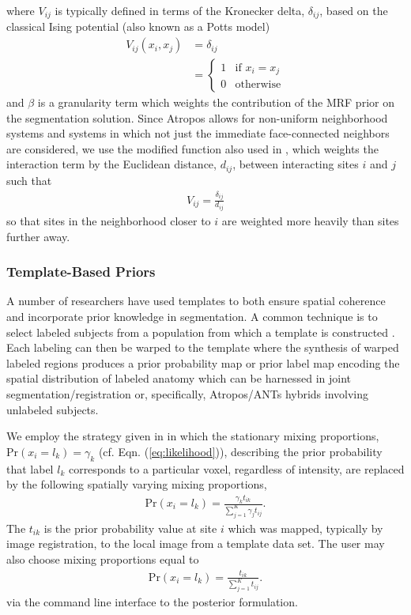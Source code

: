 \documentclass[11pt,english]{article}
\begin{document}
where $V_{ij}$ is typically defined in terms of the Kronecker delta,
$\delta_{ij}$, based on the classical Ising potential (also known as a Potts model) \citep{Besag1974}
\begin{align}
V_{ij}(x_i, x_j) &= \delta_{ij} \nonumber \\
                          &= \left\{
                          \begin{array}{ll}
                            1 & \text{if } x_i = x_j \\
                            0 & \text{otherwise}
                          \end{array}
                         \right.   
\end{align}
and $\beta$ is a granularity term which weights the contribution of the MRF prior on the segmentation solution.
Since Atropos allows for non-uniform neighborhood systems and systems in which not just the immediate face-connected neighbors are considered, we use the modified function also used in \cite{Noe2001}, which weights the interaction term by the Euclidean distance, $d_{ij}$,  between interacting sites $i$ and $j$ such that 
\begin{align}
  V_{ij} = \frac{\delta_{ij}}{d_{ij}}
\end{align}
so that sites in the neighborhood closer to $i$ are weighted more heavily than sites further away.

\subsubsection{Template-Based Priors}
A number of researchers have used templates to both
ensure spatial coherence and incorporate prior knowledge in
segmentation.  A common technique is to select labeled subjects from a
population from which a template is constructed \citep[e.g.][which is
also available in the ANTs toolkit]{Avants2010}.  Each labeling can
then be warped to the template where the synthesis of warped labeled
regions produces a prior probability map or prior label map encoding
the spatial distribution of labeled anatomy which can be harnessed in
joint segmentation/registration or, specifically, Atropos/ANTs hybrids involving unlabeled subjects.

We employ the strategy given in \cite{Ashburner2005} in which the
stationary mixing proportions, $\mathrm{Pr}(x_i = l_k) = \gamma_k$
(cf. Eqn. (\ref{eq:likelihood})), 
describing the prior probability that label $l_k$ corresponds to a particular voxel, regardless of intensity, are replaced by the following spatially varying mixing proportions,
\begin{align}
\mathrm{Pr}(x_i = l_k) = \frac{\gamma_k t_{ik}}{\sum_{j=1}^K\gamma_j t_{ij}}.
\end{align}
The $t_{ik}$ is the prior probability value at site $i$ which was
mapped, typically by image registration, to the local image
from a template data set.  The user may also
choose mixing proportions equal to
\begin{align}
\mathrm{Pr}(x_i = l_k) = \frac{t_{ik}}{\sum_{j=1}^K t_{ij}}.
\end{align}
via the command line interface to the posterior formulation.
\end{document}
